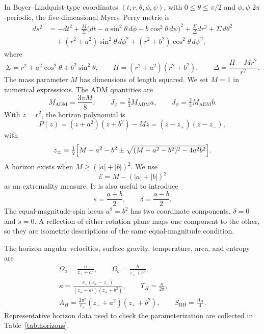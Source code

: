 \documentclass[10pt]{article}
\theoremstyle{plain}
\begin{document}
In Boyer--Lindquist-type coordinates $(t,r,\theta,\phi,\psi)$, with
$0\leq\theta\leq\pi/2$ and $\phi,\psi$ $2\pi$-periodic, the five-dimensional
Myers--Perry metric is
\begin{align}
ds^2 &= -dt^2+\frac{M}{\Sigma}
  \bigl(dt-a\sin^2\theta\,d\phi-b\cos^2\theta\,d\psi\bigr)^2
  +\frac{\Sigma}{\Delta}dr^2+\Sigma\,d\theta^2 \nonumber\\
 &\quad +(r^2+a^2)\sin^2\theta\,d\phi^2+(r^2+b^2)\cos^2\theta\,d\psi^2 ,
\label{eq:metric}
\end{align}
where
\begin{equation}
\Sigma=r^2+a^2\cos^2\theta+b^2\sin^2\theta,\qquad
\Pi=(r^2+a^2)(r^2+b^2),\qquad
\Delta=\frac{\Pi-Mr^2}{r^2}.
\end{equation}
The mass parameter $M$ has dimensions of length squared. We set $M=1$ in
numerical expressions. The ADM quantities are
\begin{equation}
M_{\mathrm{ADM}}=\frac{3\pi M}{8},\qquad
J_\phi=\tfrac{2}{3}M_{\mathrm{ADM}}a,\qquad
J_\psi=\tfrac{2}{3}M_{\mathrm{ADM}}b.
\end{equation}
With $z=r^2$, the horizon polynomial is
\begin{equation}
P(z)=(z+a^2)(z+b^2)-Mz=(z-z_+)(z-z_-),
\end{equation}
with
\begin{equation}
z_\pm=\tfrac{1}{2}\Bigl[M-a^2-b^2\pm\sqrt{(M-a^2-b^2)^2-4a^2b^2}\Bigr].
\end{equation}
A horizon exists when $M\geq(|a|+|b|)^2$. We use
\begin{equation}
\mathcal{E}=M-(|a|+|b|)^2
\end{equation}
as an extremality measure. It is also useful to introduce
\begin{equation}
s=\frac{a+b}{2},\qquad \delta=\frac{a-b}{2}.
\end{equation}
The equal-magnitude-spin locus $a^2=b^2$ has two coordinate components,
$\delta=0$ and $s=0$. A reflection of either rotation plane maps one component
to the other, so they are isometric descriptions of the same equal-magnitude
condition.

The horizon angular velocities, surface gravity, temperature, area, and entropy
are
\begin{gather}
\Omega_a=\frac{a}{z_++a^2},\qquad \Omega_b=\frac{b}{z_++b^2},\\
\kappa=\frac{r_+(z_+-z_-)}{(z_++a^2)(z_++b^2)},\qquad T_H=\frac{\kappa}{2\pi},\\
A_H=\frac{2\pi^2}{r_+}(z_++a^2)(z_++b^2),\qquad S_{\mathrm{BH}}=\frac{A_H}{4}.
\end{gather}
Representative horizon data used to check the parameterization are collected in
Table~\ref{tab:horizons}.
\end{document}
